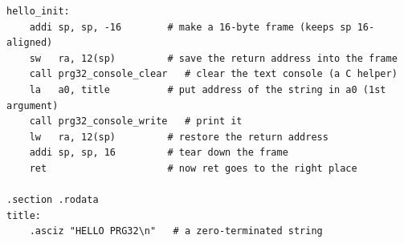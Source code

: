 \begin{lstlisting}[style=asm,caption={The stack-frame idiom. Save \reg{ra}, do work that may call C, restore \reg{ra}, return.}]
hello_init:
    addi sp, sp, -16        # make a 16-byte frame (keeps sp 16-aligned)
    sw   ra, 12(sp)         # save the return address into the frame
    call prg32_console_clear   # clear the text console (a C helper)
    la   a0, title          # put address of the string in a0 (1st argument)
    call prg32_console_write   # print it
    lw   ra, 12(sp)         # restore the return address
    addi sp, sp, 16         # tear down the frame
    ret                     # now ret goes to the right place

.section .rodata
title:
    .asciz "HELLO PRG32\n"   # a zero-terminated string
\end{lstlisting}